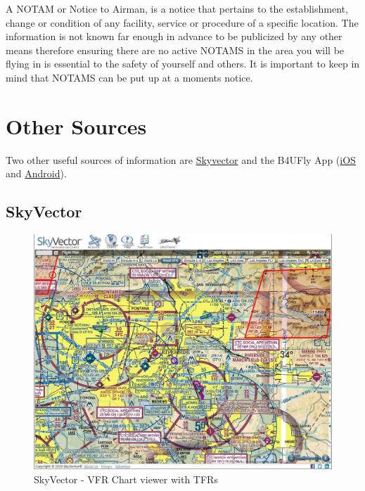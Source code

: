 \documentclass[
]{book}
\begin{document}
A NOTAM or Notice to Airman, is a notice that pertains to the establishment, change or condition of any facility, service or procedure of a specific location. The information is not known far enough in advance to be publicized by any other means therefore ensuring there are no active NOTAMS in the area you will be flying in is essential to the safety of yourself and others. It is important to keep in mind that NOTAMS can be put up at a moments notice.

\hypertarget{other-sources}{%
\section{Other Sources}\label{other-sources}}

Two other useful sources of information are \href{https://skyvector.com/}{Skyvector} and the B4UFly App (\href{https://apps.apple.com/us/app/b4ufly/id992427109}{iOS} and \href{https://play.google.com/store/apps/details?id=gov.faa.b4ufly2\&hl=en}{Android}).

\hypertarget{skyvector}{%
\subsection{SkyVector}\label{skyvector}}

\begin{figure}

{\centering \includegraphics[width=0.9\linewidth]{images/skyvector} 

}

\caption{SkyVector - VFR Chart viewer with TFRs}\label{fig:skyvector}
\end{figure}
\end{document}
